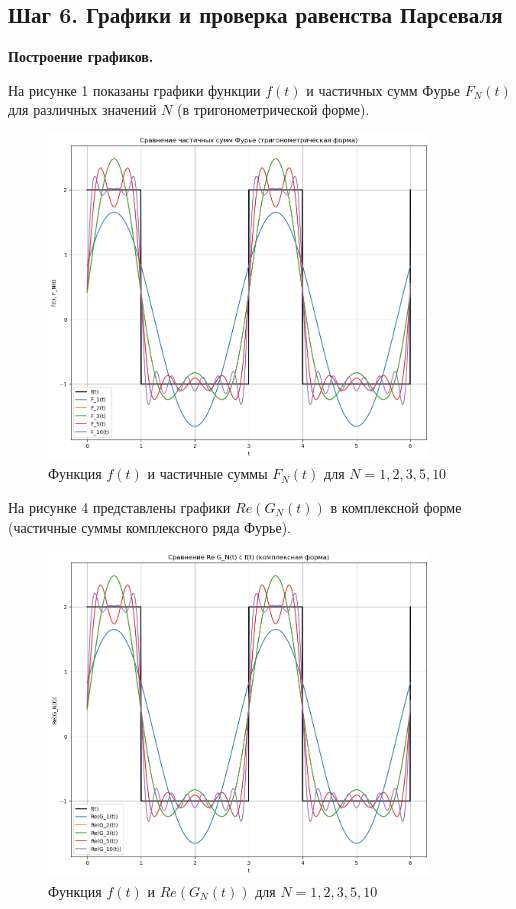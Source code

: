 \subsection*{Шаг 6. Графики и проверка равенства Парсеваля}

\textbf{Построение графиков.}

На рисунке 1 показаны графики функции $f(t)$ и частичных сумм Фурье $F_N(t)$ для различных значений $N$ (в тригонометрической форме).

\begin{figure}[H]
    \centering
    \includegraphics[width=0.9\textwidth]{fn_plot.png}
    \caption{Функция $f(t)$ и частичные суммы $F_N(t)$ для $N = 1, 2, 3, 5, 10$}
    \label{fig:fn}
\end{figure}

На рисунке 4 представлены графики $Re(G_N(t))$ в комплексной форме (частичные суммы комплексного ряда Фурье).

\begin{figure}[H]
    \centering
    \includegraphics[width=0.9\textwidth]{gn_plot.png}
    \caption{Функция $f(t)$ и $Re(G_N(t))$ для $N = 1, 2, 3, 5, 10$}
    \label{fig:gn}
\end{figure}

